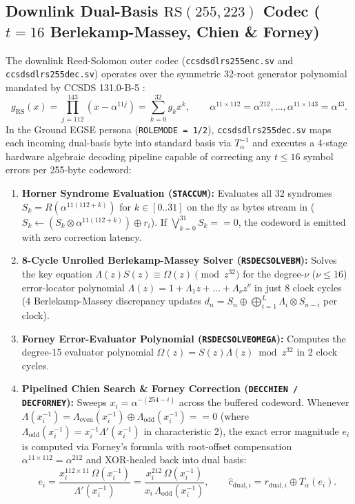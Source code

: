 \documentclass[10pt,a4paper]{article}
\renewcommand{\_}{\origunderscore\penalty0\hskip0pt\relax}
\numberwithin{equation}{section}
\numberwithin{table}{section}
\numberwithin{figure}{section}
\begin{document}
\subsection{Downlink Dual-Basis $\text{RS}(255,223)$ Codec ($t=16$ Berlekamp-Massey, Chien \& Forney)}
The downlink Reed-Solomon outer codec (\texttt{ccsds\_dl\_rs255\_223\_enc.sv} and \texttt{ccsds\_dl\_rs255\_223\_dec.sv}) operates over the symmetric 32-root generator polynomial mandated by CCSDS 131.0-B-5 \cite{ccsds131}:
\begin{equation}
  g_{\text{RS}}(x) = \prod_{j=112}^{143}\!\left(x - \alpha^{11j}\right) = \sum_{k=0}^{32} g_k x^k, \qquad \alpha^{11 \times 112} = \alpha^{212}, \dots, \alpha^{11 \times 143} = \alpha^{43}.
\end{equation}
In the Ground EGSE persona (\texttt{ROLE\_MODE = 1/2}), \texttt{ccsds\_dl\_rs255\_223\_dec.sv} maps each incoming dual-basis byte into standard basis via $T_\alpha^{-1}$ and executes a 4-stage hardware algebraic decoding pipeline capable of correcting any $t \le 16$ symbol errors per 255-byte codeword:
\begin{enumerate}\setlength{\itemsep}{2pt}
  \item \textbf{Horner Syndrome Evaluation (\texttt{ST\_ACCUM}):} Evaluates all 32 syndromes $S_k = R(\alpha^{11(112+k)})$ for $k \in [0..31]$ on the fly as bytes stream in ($S_k \leftarrow (S_k \otimes \alpha^{11(112+k)}) \oplus r_i$). If $\bigvee_{k=0}^{31} S_k == 0$, the codeword is emitted with zero correction latency.
  \item \textbf{8-Cycle Unrolled Berlekamp-Massey Solver (\texttt{RS\_DEC\_SOLVE\_BM}):} Solves the key equation $\Lambda(z) S(z) \equiv \Omega(z) \pmod{z^{32}}$ for the degree-$\nu$ ($\nu \le 16$) error-locator polynomial $\Lambda(z) = 1 + \Lambda_1 z + \dots + \Lambda_\nu z^\nu$ in just 8 clock cycles (4 Berlekamp-Massey discrepancy updates $d_n = S_n \oplus \bigoplus_{i=1}^{L} \Lambda_i \otimes S_{n-i}$ per clock).
  \item \textbf{Forney Error-Evaluator Polynomial (\texttt{RS\_DEC\_SOLVE\_OMEGA}):} Computes the degree-15 evaluator polynomial $\Omega(z) = S(z)\Lambda(z) \bmod z^{32}$ in 2 clock cycles.
  \item \textbf{Pipelined Chien Search \& Forney Correction (\texttt{DEC\_CHIEN / DEC\_FORNEY}):} Sweeps $x_i = \alpha^{-(254-i)}$ across the buffered codeword. Whenever $\Lambda(x_i^{-1}) = \Lambda_{\text{even}}(x_i^{-1}) \oplus \Lambda_{\text{odd}}(x_i^{-1}) == 0$ (where $\Lambda_{\text{odd}}(x_i^{-1}) = x_i^{-1}\Lambda'(x_i^{-1})$ in characteristic 2), the exact error magnitude $e_i$ is computed via Forney's formula with root-offset compensation $\alpha^{11 \times 112} = \alpha^{212}$ and XOR-healed back into dual basis:
  \begin{equation}
    e_i = \frac{x_i^{112\times 11}\,\Omega(x_i^{-1})}{\Lambda'(x_i^{-1})} = \frac{x_i^{212}\,\Omega(x_i^{-1})}{x_i\,\Lambda_{\text{odd}}(x_i^{-1})}, \qquad \hat{c}_{\text{dual},i} = r_{\text{dual},i} \oplus T_\alpha(e_i).
  \end{equation}
\end{enumerate}
\end{document}
